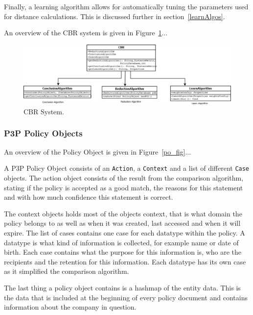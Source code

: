 Finally, a learning algorithm allows for automatically tuning the parameters used for distance calculations. This is discussed further in section~\ref{learnAlgos}.

An overview of the CBR system is given in Figure~\ref{cbr_fig}...


\begin{figure}[htbp]
\begin{center}
\includegraphics[width = \textwidth]{DesignReport/uml/CBR.png}
\caption{CBR System.}
\label{cbr_fig}
\end{center}
\end{figure}


\subsubsection{P3P Policy Objects}
An overview of the Policy Object is given in Figure~\ref{po_fig}...

A P3P Policy Object consists of an \texttt{Action}, a \texttt{Context} and a list of different \texttt{Case} objects. The action object consists of the result from the comparison algorithm, stating if the policy is accepted as a good match, the reasons for this statement and with how much confidence this statement is correct.

The context objects holds most of the objects context, that is what domain the policy belongs to as well as when it was created, last accessed and when it will expire. The list of cases contains one case for each datatype within the policy. A datatype is what kind of information is collected, for example name or date of birth. Each case contains what the purpose for this information is, who are the recipients and the retention for this information. Each datatype has its own case as it simplified the comparison algorithm.

The last thing a policy object contains is a hashmap of the entity data. This is the data that is included at the beginning of every policy document and contains information about the company in question.

